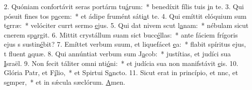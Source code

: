 2. Quóniam confortávit seras portárm tu\uline{á}rum:~* benedíxit fílis tuis \uline{i}n te.
3. Qui pósuit fines tos p\uline{a}cem:~* et ádipe frumént sáti\uline{a}t te.
4. Qui emíttit elóquium sum t\uline{e}rræ:~* velóciter currt sermo \uline{e}jus.
5. Qui dat nivem scut l\uline{a}nam:~* nébulam sicut cnerem sp\uline{a}rgit.
6. Mittit crystállum suam sict bucc\uline{é}llas:~* ante fáciem frígoris ejus s sustin\uline{é}bit?
7. Emíttet verbum suum, et liquefácet \uline{e}a:~* flabit spíritus ejus, t fluent \uline{a}quæ.
8. Qui annúntiat verbum sum J\uline{a}cob:~* justítias, et judíci sua \uline{I}sraël.
9. Non fecit táliter omni nti\uline{ó}ni:~* et judícia sua non manifstávit \uline{e}is.
10. Glória Patr, et F\uline{í}lio,~* et Spirtui S\uline{a}ncto.
11. Sicut erat in princípio, et nnc, et s\uline{e}mper,~* et in sǽcula sæclórum. \uline{A}men.
